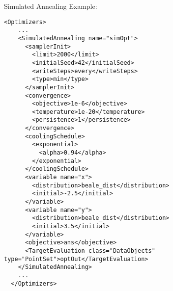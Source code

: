 \hspace{24pt}
Simulated Annealing Example:
\begin{lstlisting}[style=XML]
  <Optimizers>
    ...
    <SimulatedAnnealing name="simOpt">
      <samplerInit>
        <limit>2000</limit>
        <initialSeed>42</initialSeed>
        <writeSteps>every</writeSteps>
        <type>min</type>
      </samplerInit>
      <convergence>
        <objective>1e-6</objective>
        <temperature>1e-20</temperature>
        <persistence>1</persistence>
      </convergence>
      <coolingSchedule>
        <exponential>
          <alpha>0.94</alpha>
        </exponential>
      </coolingSchedule>
      <variable name="x">
        <distribution>beale_dist</distribution>
        <initial>-2.5</initial>
      </variable>
      <variable name="y">
        <distribution>beale_dist</distribution>
        <initial>3.5</initial>
      </variable>
      <objective>ans</objective>
      <TargetEvaluation class="DataObjects" type="PointSet">optOut</TargetEvaluation>
    </SimulatedAnnealing>
    ...
  </Optimizers>
\end{lstlisting}

